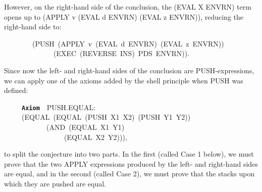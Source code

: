 \documentclass[11pt]{book}
\newenvironment{pubasis}{\begin{flushleft}\ttfamily\small}{\normalsize\rmfamily\end{flushleft}}
\newcommand{\axiomordefinition}[1]{\vspace{6pt}\texttt{\textbf{#1}}}
\begin{document}
However, on the right-hand side of the conclusion, the
(EVAL X ENVRN) term opens up to (APPLY v (EVAL d ENVRN) (EVAL z ENVRN)), reducing the right-hand side
to:
\begin{pubasis}
~~~~~~~~(PUSH~(APPLY~v~(EVAL~d~ENVRN)~(EVAL~z~ENVRN))\\
~~~~~~~~~~~~~~(EXEC~(REVERSE~INS)~PDS~ENVRN)).\\
\end{pubasis}
Since now the left- and right-hand sides of the conclusion are
PUSH-expressions,
we can apply one of the axioms added by the shell principle
when PUSH was defined:
\begin{pubasis}
~~~~~\axiomordefinition{Axiom}~~PUSH.EQUAL:\\
~~~~~(EQUAL~(EQUAL~(PUSH~X1~X2)~(PUSH~Y1~Y2))\\
~~~~~~~~~~~~(AND~(EQUAL~X1~Y1)\\
~~~~~~~~~~~~~~~~~(EQUAL~X2~Y2))),\\
\end{pubasis}
to split the conjecture into two parts.  In the first (called Case 1 below),
we must prove that the two APPLY expressions produced by the left- and
right-hand sides are equal, and in the second (called Case 2), we must prove that
the stacks upon which they are pushed are equal.
\end{document}
